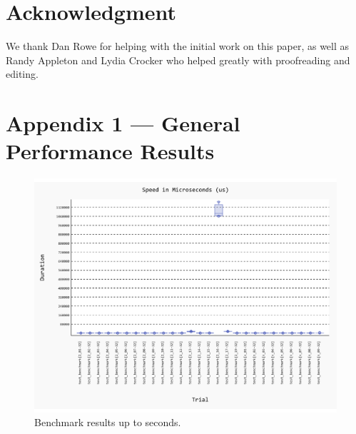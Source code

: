 \documentclass[conference]{IEEEtran}
\begin{document}


\section{Acknowledgment}

We thank Dan Rowe for helping with the initial work on this paper, as well as Randy Appleton and Lydia Crocker who helped greatly with proofreading and editing.

\section{Appendix 1 --- General Performance Results}

\begin{figure}[H]
    \centering
    \includegraphics[width=\linewidth]{figures/benchmark/20241202_220720.pdf}
    \caption{Benchmark results up to seconds.}
    \label{fig:benchmark_in_s}
\end{figure}
\end{document}
